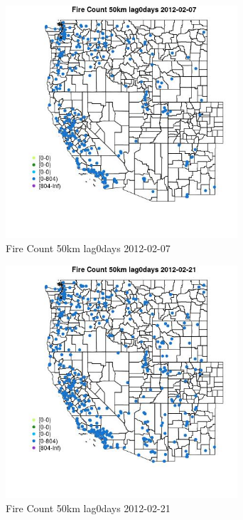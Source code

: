 \begin{figure} 
\centering  
\includegraphics[width=0.77\textwidth]{Code_Outputs/Report_ML_input_PM25_Step4_part_f_de_duplicated_aveswNAs_MapObsFire_Count_50km_lag0days2012-02-07.jpg} 
\caption{\label{fig:Report_ML_input_PM25_Step4_part_f_de_duplicated_aveswNAsMapObsFire_Count_50km_lag0days2012-02-07}Fire Count 50km lag0days 2012-02-07} 
\end{figure} 
 

\begin{figure} 
\centering  
\includegraphics[width=0.77\textwidth]{Code_Outputs/Report_ML_input_PM25_Step4_part_f_de_duplicated_aveswNAs_MapObsFire_Count_50km_lag0days2012-02-21.jpg} 
\caption{\label{fig:Report_ML_input_PM25_Step4_part_f_de_duplicated_aveswNAsMapObsFire_Count_50km_lag0days2012-02-21}Fire Count 50km lag0days 2012-02-21} 
\end{figure} 
 

